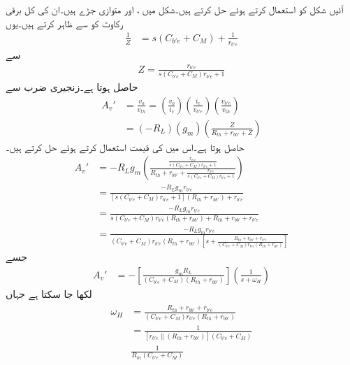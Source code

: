 آئیں شکل  کو  استعمال کرتے ہوئے حل کرتے ہیں۔شکل میں ،  اور  متوازی جڑے ہیں۔ان کی کل برقی رکاوٹ کو  سے ظاہر کرتے ہیں۔یوں
\begin{align*}
\frac{1}{Z}&=s\left(C_{b'e}+C_M \right)+\frac{1}{r_{b'e}}
\end{align*}
سے
\begin{align}
Z=\frac{r_{b'e}}{s \left(C_{b'e}+C_M \right) r_{b'e}+1}
\end{align}
حاصل ہوتا ہے۔زنجیری ضرب سے
\begin{align*}
A_v'&=\frac{v_o}{v_{th}}=\left(\frac{v_o}{i_c}\right) \left(\frac{i_c}{v_{b'e}}\right) \left(\frac{v_{b'e}}{v_{th}}\right)\\
&=\left(-R_L \right) \left(g_m \right) \left(\frac{Z}{R_{th}+r_{bb'}+Z} \right)
\end{align*}
حاصل ہوتا ہے۔اس میں  کی قیمت استعمال کرتے ہوئے حل کرتے ہیں۔
\begin{align*}
A_v'&=-R_L g_m \left(\frac{\frac{r_{b'e}}{s \left(C_{b'e}+C_M \right) r_{b'e}+1}}{R_{th}+r_{bb'}+\frac{r_{b'e}}{s \left(C_{b'e}+C_M \right) r_{b'e}+1}} \right)\\
&=\frac{-R_L g_m r_{b'e}}{\left[s \left(C_{b'e}+C_M \right) r_{b'e}+1 \right] \left(R_{th}+r_{bb'} \right) +r_{b'e}}\\
&=\frac{-R_L g_m r_{b'e}}{s \left(C_{b'e}+C_M \right) r_{b'e} \left(R_{th}+r_{bb'} \right) +R_{th}+r_{bb'}+r_{b'e}}\\
&=\frac{-R_L g_m r_{b'e}}{\left(C_{b'e}+C_M \right) r_{b'e} \left(R_{th}+r_{bb'} \right) \left[s+\frac{R_{th}+r_{bb'}+r_{b'e}}{\left(C_{b'e}+C_M \right) r_{b'e} \left(R_{th}+r_{bb'} \right)} \right]}
\end{align*}
جسے
\begin{align}  \label{مساوات_تعددی_ردعمل_بلند_تعددی_تھونن}
A_v'&=-\left[\frac{g_m R_L}{\left(C_{b'e}+C_M \right) \left(R_{th}+r_{bb'} \right)}\right] \left(\frac{1}{s+\omega_H} \right)
\end{align}
لکھا جا سکتا ہے جہاں
\begin{gather}
\begin{aligned}\label{مساوات_تعددی_ردعمل_بلند_انقطاعی_تعدد_ٹھیک_ٹھیک}
\omega_H&=\frac{R_{th}+r_{bb'}+r_{b'e}}{\left(C_{b'e}+C_M \right) r_{b'e} \left(R_{th}+r_{bb'} \right)}\\
&=\frac{1}{\left[r_{b'e} \mathbin{\|} \left(R_{th}+r_{bb'} \right) \right] \left(C_{b'e}+C_M \right)}\\
&\frac{1}{R_m \left(C_{b'e}+C_{M} \right)}
\end{aligned}
\end{gather}
